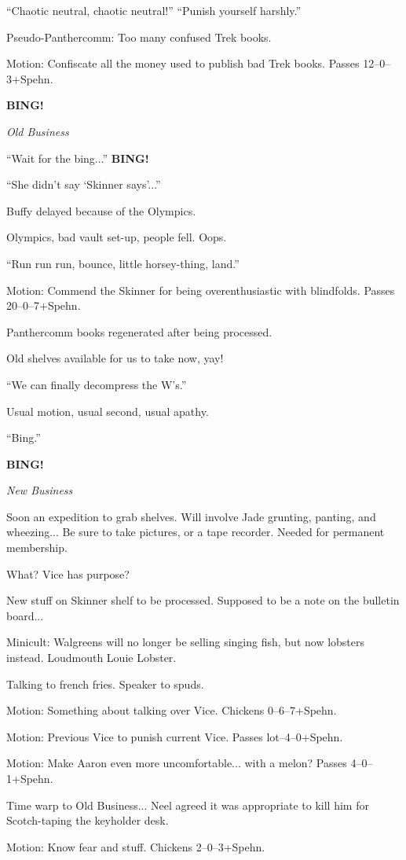 \documentclass[12pt]{article}
\newcommand{\bing}{{\bf BING!} }
\newcommand{\goto}[1]{\bing \vskip 12pt \centerline{{\em{#1}}}}
\begin{document}
``Chaotic neutral, chaotic neutral!''  ``Punish yourself harshly.''

Pseudo-Panthercomm: Too many confused Trek books.

Motion: Confiscate all the money used to publish bad Trek books.
Passes 12--0--3+Spehn.

\goto{Old Business}

``Wait for the bing...''  \bing

``She didn't say `Skinner says'...''

Buffy delayed because of the Olympics.

Olympics, bad vault set-up, people fell.  Oops.

``Run run run, bounce, little horsey-thing, land.''

Motion: Commend the Skinner for being overenthusiastic with blindfolds.
Passes 20--0--7+Spehn.

Panthercomm books regenerated after being processed.

Old shelves available for us to take now, yay!

``We can finally decompress the W's.''

Usual motion, usual second, usual apathy.

``Bing.''

\goto{New Business}

Soon an expedition to grab shelves.  Will involve Jade grunting, panting,
and wheezing...  Be sure to take pictures, or a tape recorder.  Needed
for permanent membership.

What?  Vice has purpose?

New stuff on Skinner shelf to be processed.  Supposed to be a note on
the bulletin board...

Minicult: Walgreens will no longer be selling singing fish, but now
lobsters instead.  Loudmouth Louie Lobster.

Talking to french fries.  Speaker to spuds.

Motion: Something about talking over Vice.  Chickens 0--6--7+Spehn.

Motion: Previous Vice to punish current Vice.  Passes lot--4--0+Spehn.

Motion: Make Aaron even more uncomfortable... with a melon?  Passes
4--0--1+Spehn.

Time warp to Old Business...  Neel agreed it was appropriate to kill
him for Scotch-taping the keyholder desk.

Motion: Know fear and stuff.  Chickens 2--0--3+Spehn.
\end{document}
